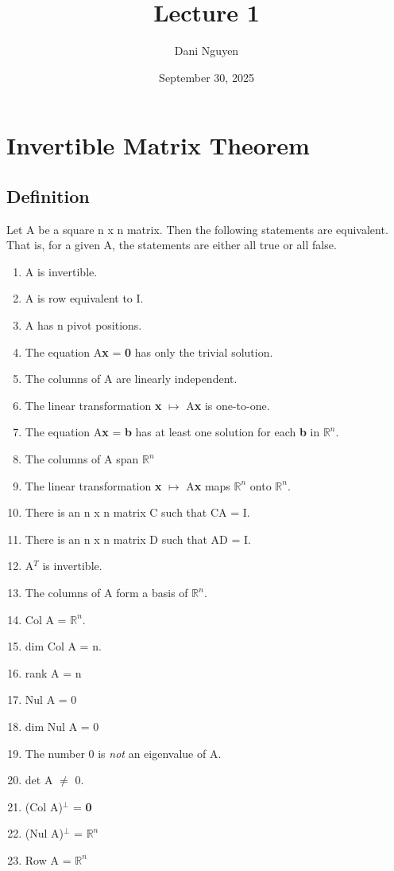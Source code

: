 \documentclass[12pt, letterpaper]{article}
\title{Lecture 1}
\author{Dani Nguyen}
\date{September 30, 2025}
\begin{document}
\maketitle
\tableofcontents

\section{Invertible Matrix Theorem}
\subsection{Definition}
Let A be a square n x n matrix. Then the following statements are
equivalent. That is, for a given A, the statements are either all 
true or all false.
\begin{enumerate}
    \item A is invertible.
    \item A is row equivalent to I.
    \item A has n pivot positions.
    \item The equation A\textbf{x} = \textbf{0} has only the trivial solution.
    \item The columns of A are linearly independent.
    \item The linear transformation \textbf{x} $\mapsto$ A\textbf{x} is one-to-one.
    \item The equation A\textbf{x} = \textbf{b} has at least one solution for each \textbf{b} in $\mathbb{R}^n$.
    \item The columns of A span $\mathbb{R}^n$
    \item The linear transformation \textbf{x} $\mapsto$ A\textbf{x} maps $\mathbb{R}^n$ onto $\mathbb{R}^n$.
    \item There is an n x n matrix C such that CA = I.
    \item There is an n x n matrix D such that AD = I.
    \item A$^T$ is invertible.
    \item The columns of A form a basis of $\mathbb{R}^n$.
    \item Col A = $\mathbb{R}^n$.
    \item dim Col A = n.
    \item rank A = n
    \item Nul A = {0}
    \item dim Nul A = 0
    \item The number 0 is \emph{not} an eigenvalue of A.
    \item det A $\neq$ 0.
    \item (Col A)$^\bot$ = \textbf{0}
    \item (Nul A)$^\bot$ = $\mathbb{R}^n$
    \item Row A = $\mathbb{R}^n$
\end{enumerate}
\end{document}
